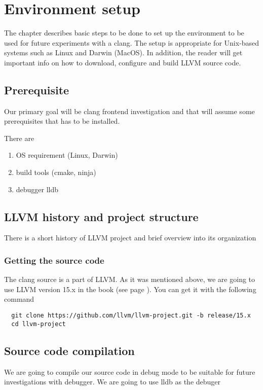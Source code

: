 \chapter{Environment setup}
The chapter describes basic steps to be done to set up the environment to be
used for future experiments with a clang. The setup is appropriate for
Unix-based systems such as Linux and Darwin (MacOS). In addition, the reader
will get important info on how to download, configure and build LLVM source
code.  


\section{Prerequisite}
Our primary goal will be clang frontend investigation and that will assume some
prerequisites that has to be installed.

There are
\begin{enumerate}
\item OS requirement (Linux, Darwin)
\item build tools (cmake, ninja)
\item debugger lldb
\end{enumerate}

\section{LLVM history and project structure}

There is a short history of LLVM project and brief overview into its
organization 

\subsection{Getting the source code}

The clang source is a part of LLVM. As it was mentioned above, we are going to
use LLVM version 15.x in the book (see page \pageref{c:release15}). You can get
it with the following command 
\begin{verbatim}
  git clone https://github.com/llvm/llvm-project.git -b release/15.x
  cd llvm-project
\end{verbatim}

\section{Source code compilation}

We are going to compile our source code in debug mode to be suitable
for future investigations with debugger. We are going to use lldb as the debuger

